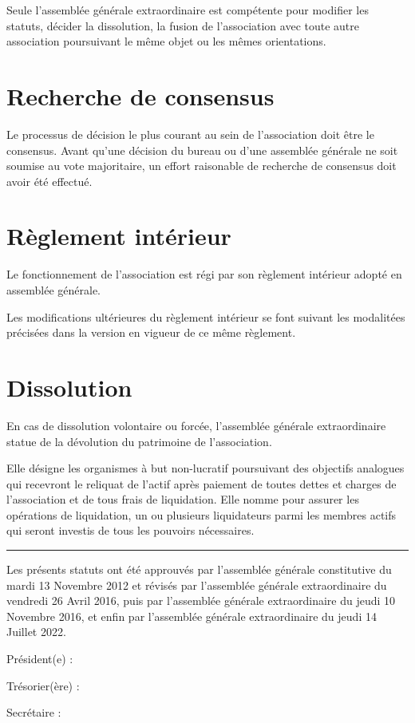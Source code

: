 \documentclass[a4paper, 11pt]{article}
\newcommand{\dateAGC}{mardi 13 Novembre 2012}
\newcommand{\dateAGE}{vendredi 26 Avril 2016}
\newcommand{\dateAGEdeux}{jeudi 10 Novembre 2016}
\newcommand{\dateAGEtrois}{jeudi 14 Juillet 2022}
\newcommand\sep{\noindent\rule{\linewidth}{.5pt}}
\begin{document}
Seule l'assemblée générale extraordinaire est compétente pour modifier les statuts, décider la dissolution, la fusion de
l'association avec toute autre association poursuivant le même objet ou les mêmes orientations.


\section{Recherche de consensus} %

Le processus de décision le plus courant au sein de l'association doit être le consensus. Avant qu'une décision du
bureau ou d'une assemblée générale ne soit soumise au vote majoritaire, un effort raisonable de recherche de consensus
doit avoir été effectué.


\section{Règlement intérieur} %

Le fonctionnement de l'association est régi par son règlement intérieur adopté en assemblée générale.

Les modifications ultérieures du règlement intérieur se font suivant les modalitées précisées dans la version en vigueur
de ce même règlement.


\section{Dissolution} %

En cas de dissolution volontaire ou forcée, l'assemblée générale extraordinaire statue de la dévolution du patrimoine de
l'association.

Elle désigne les organismes à but non-lucratif poursuivant des objectifs analogues qui recevront le reliquat de l'actif
après paiement de toutes dettes et charges de l'association et de tous frais de liquidation. Elle nomme pour assurer les
opérations de liquidation, un ou plusieurs liquidateurs parmi les membres actifs qui seront investis de tous les
pouvoirs nécessaires.



\bigskip\bigskip

\sep

\bigskip\bigskip

Les présents statuts ont été approuvés par l'assemblée générale constitutive du \dateAGC{} et révisés par l'assemblée
générale extraordinaire du \dateAGE{}, puis par l'assemblée générale extraordinaire du \dateAGEdeux{}, et enfin par 
l'assemblée générale extraordinaire du \dateAGEtrois{}.

\bigskip\bigskip

Président(e) :

\bigskip\bigskip

Trésorier(ère) :

\bigskip\bigskip

Secrétaire :
\end{document}

